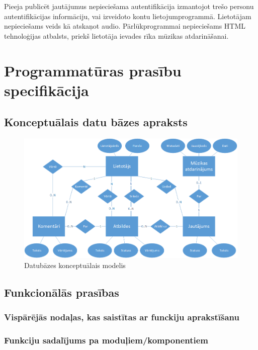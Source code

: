 \documentclass[12pt]{article}
\begin{document}
Pieeja publicēt jautājumus nepieciešama autentifikācija izmantojot trešo personu autentifikācijas informāciju, vai izveidoto kontu lietojumprogrammā. Lietotājam nepieciešams veids kā atskaņot audio. Pārlūkprogrammai nepieciešams HTML tehnoloģijas atbalsts, priekš lietotāja ievades rīka mūzikas atdarināšanai.

\section{Programmatūras prasību specifikācija}

\subsection{Konceptuālais datu bāzes apraksts}

\begin{figure}[H]
	\includegraphics[width=\linewidth]{DB_concept.png}
	\caption{Datubāzes konceptuālais modelis}
	\label{fig:db_konceptualais}
\end{figure}

\subsection{Funkcionālās prasības}

\subsubsection{Vispārējās nodaļas, kas saistītas ar funckiju aprakstīšanu}

\subsubsection{Funkciju sadalījums pa moduļiem/komponentiem}
\end{document}
